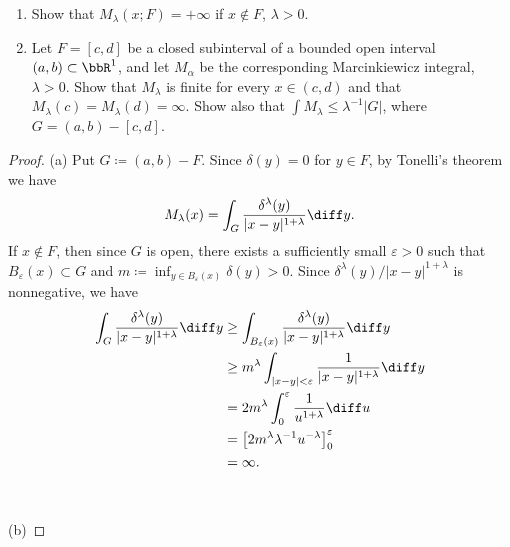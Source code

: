 \begin{problem}
\begin{enumerate}[label=(\alph*)]
\item Show that $M_\lambda(x;F)=+\infty$ if $x\notin F$, $\lambda>0$.
\item Let $F=[c,d]$ be a closed subinterval of a bounded open interval
  $(a,b)\subset\bbR^1$, and let $M_\alpha$ be the corresponding
  Marcinkiewicz integral, $\lambda>0$. Show that $M_\lambda$ is finite for
  every $x\in(c,d)$ and that $M_\lambda(c)=M_\lambda(d)=\infty$. Show also
  that $\int M_\lambda\leq\lambda^{-1}|G|$, where $G=(a,b)-[c,d]$.
\end{enumerate}
\end{problem}
\begin{proof}
(a) Put $G\coloneqq(a,b)\minus F$. Since $\delta(y)=0$ for $y\in F$, by
Tonelli's theorem we have
\begin{equation}
  \label{eq:application-of-tonelli-2}
M_\lambda(x)=\int_G\frac{\delta^\lambda(y)}{|x-y|^{1+\lambda}}\diff y.
\end{equation}
If $x\notin F$, then since $G$ is open, there exists a sufficiently small
$\varepsilon>0$ such that $B_\varepsilon(x)\subset G$ and
$m\coloneqq\inf_{y\in B_\varepsilon(x)}\delta(y)>0$. Since
$\delta^\lambda(y)/|x-y|^{1+\lambda}$ is nonnegative, we have
\begin{align*}
\int_G\frac{\delta^\lambda(y)}{|x-y|^{1+\lambda}}\diff y
&\geq
  \int_{B_\varepsilon(x)}\frac{\delta^\lambda(y)}{|x-y|^{1+\lambda}}\diff
  y\\
&\geq m^\lambda\int_{|x-y|<\varepsilon}\frac{1}{|x-y|^{1+\lambda}}\diff y\\
&=2m^\lambda\int_0^\varepsilon\frac{1}{u^{1+\lambda}}\diff u\\
&=\left[2m^\lambda\lambda^{-1}u^{-\lambda}\right]_0^\varepsilon\\
&=\infty.
\end{align*}
\\\\
(b)
\end{proof}

